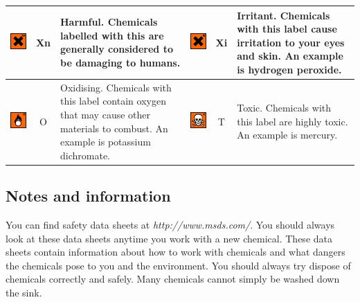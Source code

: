 \begin{center}
\begin{supertabular}{|l|c|p{3cm}|l|c|p{3cm}|}
\parbox[c]{4em}{\includegraphics[width=.1\textwidth]{photos/harmful.png}} & Xn & Harmful. Chemicals labelled with this are generally considered to be damaging to humans. & \parbox[c]{4em}{\includegraphics[width=.1\textwidth]{photos/irritant.png}} & Xi & Irritant. Chemicals with this label cause irritation to your eyes and skin. An example is hydrogen peroxide. \\ \hline 
\parbox[c]{4em}{\includegraphics[width=.1\textwidth]{photos/oxidise.png}} & O & Oxidising. Chemicals with this label contain oxygen that may cause other materials to combust. An example is potassium dichromate. & \parbox[c]{4em}{\includegraphics[width=.1\textwidth]{photos/toxic.png}} & T & Toxic. Chemicals with this label are highly toxic. An example is mercury. \\ \hline 
  \end{supertabular}
 \end{center}
\subsection*{Notes and information}
You can find safety data sheets at \textsl{http://www.msds.com/}. You should always look at these data sheets anytime you work with a new chemical. These data sheets contain information about how to work with chemicals and what dangers the chemicals pose to you and the environment. You should always try dispose of chemicals correctly and safely. Many chemicals cannot simply be washed down the sink. 

